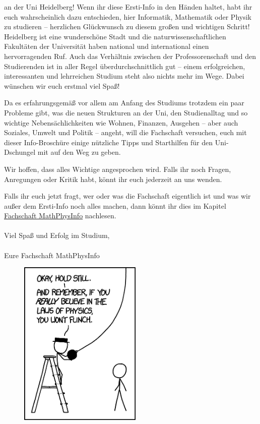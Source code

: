 
an der Uni Heidelberg! Wenn ihr diese Ersti-Info in den Händen haltet, habt ihr euch wahrscheinlich dazu entschieden, hier Informatik, Mathematik oder Physik zu studieren -- herzlichen Glückwunsch zu diesem großen und wichtigen Schritt! Heidelberg ist eine wunderschöne Stadt und die naturwissenschaftlichen Fakultäten der Universität haben national und international einen hervorragenden Ruf. Auch das Verhältnis zwischen der Professorenschaft und den Studierenden ist in aller Regel überdurchschnittlich gut -- einem erfolgreichen, interessanten und lehrreichen Studium steht also nichts mehr im Wege. Dabei wünschen wir euch erstmal viel Spaß! \smiley

Da es erfahrungsgemäß vor allem am Anfang des Studiums trotzdem ein paar Probleme gibt, was die neuen Strukturen an der Uni, den Studienalltag und so wichtige Nebensächlichkeiten wie Wohnen, Finanzen, Ausgehen -- aber auch Soziales, Umwelt und Politik -- angeht, will die Fachschaft versuchen, euch mit dieser Info-Broschüre einige nützliche Tipps und Starthilfen für den Uni-Dschungel mit auf den Weg zu geben.

\vfill


\eject

Wir hoffen, dass alles Wichtige angesprochen wird. Falls ihr noch Fragen, Anregungen oder Kritik habt, könnt ihr euch jederzeit an uns wenden.

Falls ihr euch jetzt fragt, wer oder was die Fachschaft eigentlich ist und was wir außer dem Ersti-Info noch alles machen, dann könnt ihr dies im Kapitel \hyperref[diefsmathphys]{Fachschaft MathPhysInfo} nachlesen. \\\\

\noindent Viel Spaß und Erfolg im Studium,\\\\

Eure Fachschaft MathPhysInfo


\begin{figure}[b]
\centering
\includegraphics[height=8cm]{bilder/laws_of_physics_2x.png}
\end{figure}
